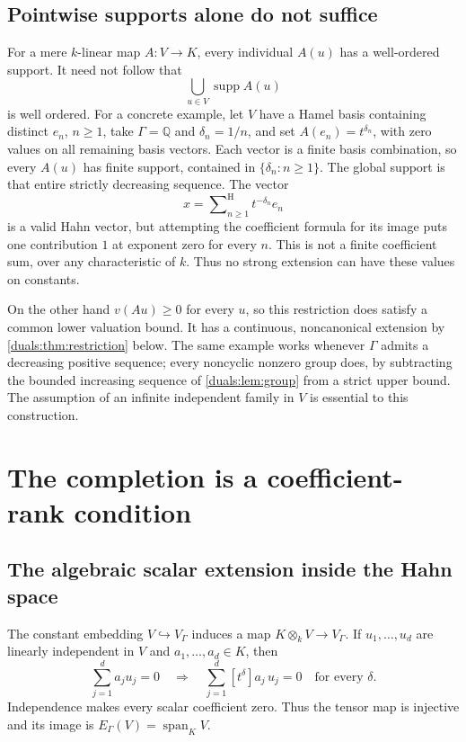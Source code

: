 \documentclass[11pt,letterpaper]{article}
\numberwithin{equation}{section}
\theoremstyle{definition}
\theoremstyle{remark}
\newcommand{\Q}{\mathbb Q}
\newcommand{\supp}{\operatorname{supp}}
\newcommand{\Span}{\operatorname{span}}
\newcommand{\sH}{\mathop{\sum}\nolimits^{\mathrm H}}
\begin{document}
\subsection{Pointwise supports alone do not suffice}
For a mere $k$-linear map $A:V\to K$, every individual $A(u)$ has a
well-ordered support. It need not follow that
\[
 \bigcup_{u\in V}\supp A(u)
\]
is well ordered. For a concrete example, let $V$ have a Hamel basis containing distinct
$e_n$, $n\ge1$, take $\Gamma=\Q$ and $\delta_n=1/n$, and set
$A(e_n)=t^{\delta_n}$, with zero values on all remaining basis vectors.
Each vector is a finite basis combination, so every $A(u)$ has finite
support, contained in $\{\delta_n:n\ge1\}$. The global support is that
entire strictly decreasing sequence. The vector
\[
 x=\sH_{n\ge1}t^{-\delta_n}e_n
\]
is a valid Hahn vector, but attempting the coefficient formula for its
image puts one contribution $1$ at exponent zero for every $n$.
This is not a finite coefficient sum, over any characteristic of $k$.
Thus no strong extension can have these values on constants.

On the other hand $v(Au)\ge0$ for every $u$, so this restriction does
satisfy a common lower valuation bound. It has a continuous, noncanonical
extension by \cref{duals:thm:restriction} below. The same example works
whenever $\Gamma$ admits a decreasing positive sequence; every noncyclic
nonzero group does, by subtracting the bounded increasing sequence of
\cref{duals:lem:group} from a strict upper bound. The assumption of an
infinite independent family in $V$ is essential to this construction.

\section{The completion is a coefficient-rank condition}
\label{duals:sec:completion}

\subsection{The algebraic scalar extension inside the Hahn space}
The constant embedding $V\hookrightarrow V_\Gamma$ induces a map
$K\otimes_kV\to V_\Gamma$. If $u_1,\ldots,u_d$ are linearly independent
in $V$ and $a_1,\ldots,a_d\in K$, then
\[
 \sum_{j=1}^d a_ju_j=0
 \quad\Longrightarrow\quad
 \sum_{j=1}^d[t^\delta]a_j\,u_j=0\quad\text{for every }\delta.
\]
Independence makes every scalar coefficient zero. Thus the tensor map is
injective and its image is $E_\Gamma(V)=\Span_KV$.
\end{document}
